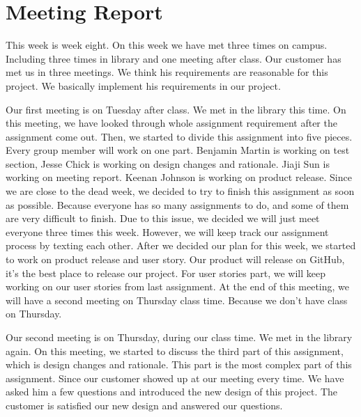 \documentclass[12pt]{article}
\begin{document}
\section{Meeting Report}

\par This week is week eight. On this week we have met three times on campus. Including three times in library and one meeting after class. Our customer has met us in three meetings. We think his requirements are reasonable for this project. We basically implement his requirements in our project. \\

\par Our first meeting is on Tuesday after class. We met in the library this time. On this meeting, we have looked through whole assignment requirement after the assignment come out. Then, we started to divide this assignment into five pieces. Every group member will work on one part. Benjamin Martin is working on test section, Jesse Chick is working on design changes and rationale. Jiaji Sun is working on meeting report. Keenan Johnson is working on product release. Since we are close to the dead week, we decided to try to finish this assignment as soon as possible. Because everyone has so many assignments to do, and some of them are very difficult to finish. Due to this issue, we decided we will just meet everyone three times this week. However, we will keep track our assignment process by texting each other. After we decided our plan for this week, we started to work on product release and user story. Our product will release on GitHub, it’s the best place to release our project. For user stories part, we will keep working on our user stories from last assignment. At the end of this meeting, we will have a second meeting on Thursday class time. Because we don’t have class on Thursday. \\

\par Our second meeting is on Thursday, during our class time. We met in the library again. On this meeting, we started to discuss the third part of this assignment, which is design changes and rationale. This part is the most complex part of this assignment. Since our customer showed up at our meeting every time. We have asked him a few questions and introduced the new design of this project. The customer is satisfied our new design and answered our questions. \\
\end{document}
